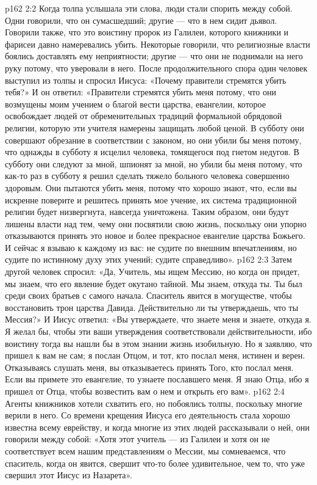 \vs p162 2:2 \pc Когда толпа услышала эти слова, люди стали спорить между собой. Одни говорили, что он сумасшедший; другие --- что в нем сидит дьявол. Говорили также, что это воистину пророк из Галилеи, которого книжники и фарисеи давно намеревались убить. Некоторые говорили, что религиозные власти боялись доставлять ему неприятности; другие --- что они не поднимали на него руку потому, что уверовали в него. После продолжительного спора один человек выступил из толпы и спросил Иисуса: «Почему правители стремятся убить тебя?» И он ответил: «Правители стремятся убить меня потому, что они возмущены моим учением о благой вести царства, евангелии, которое освобождает людей от обременительных традиций формальной обрядовой религии, которую эти учителя намерены защищать любой ценой. В субботу они совершают обрезание в соответствии с законом, но они убили бы меня потому, что однажды в субботу я исцелил человека, томящегося под гнетом недугов. В субботу они следуют за мной, шпионят за мной, но убили бы меня потому, что как\hyp{}то раз в субботу я решил сделать тяжело больного человека совершенно здоровым. Они пытаются убить меня, потому что хорошо знают, что, если вы искренне поверите и решитесь принять мое учение, их система традиционной религии будет низвергнута, навсегда уничтожена. Таким образом, они будут лишены власти над тем, чему они посвятили свою жизнь, поскольку они упорно отказываются принять это новое и более прекрасное евангелие царства Божьего. И сейчас я взываю к каждому из вас: не судите по внешним впечатлениям, но судите по истинному духу этих учений; судите справедливо».
\vs p162 2:3 Затем другой человек спросил: «Да, Учитель, мы ищем Мессию, но когда он придет, мы знаем, что его явление будет окутано тайной. Мы знаем, откуда ты. Ты был среди своих братьев с самого начала. Спаситель явится в могуществе, чтобы восстановить трон царства Давида. Действительно ли ты утверждаешь, что ты Мессия?» И Иисус ответил: «Вы утверждаете, что знаете меня и знаете, откуда я. Я желал бы, чтобы эти ваши утверждения соответствовали действительности, ибо воистину тогда вы нашли бы в этом знании жизнь изобильную. Но я заявляю, что пришел к вам не сам; я послан Отцом, и тот, кто послал меня, истинен и верен. Отказываясь слушать меня, вы отказываетесь принять Того, кто послал меня. Если вы примете это евангелие, то узнаете пославшего меня. Я знаю Отца, ибо я пришел от Отца, чтобы возвестить вам о нем и открыть его вам».
\vs p162 2:4 Агенты книжников хотели схватить его, но побоялись толпы, поскольку многие верили в него. Со времени крещения Иисуса его деятельность стала хорошо известна всему еврейству, и когда многие из этих людей рассказывали о ней, они говорили между собой: «Хотя этот учитель --- из Галилеи и хотя он не соответствует всем нашим представлениям о Мессии, мы сомневаемся, что спаситель, когда он явится, свершит что\hyp{}то более удивительное, чем то, что уже свершил этот Иисус из Назарета».

